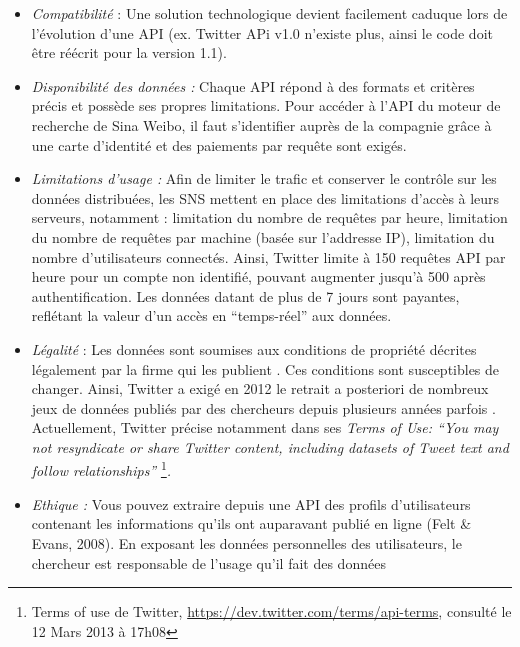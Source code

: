 \begin{itemize}
\item \textit{Compatibilit\'e }: Une solution technologique devient
facilement caduque lors de l{\textquoteright}\'evolution
d{\textquoteright}une API (ex. Twitter APi v1.0
n{\textquoteright}existe plus, ainsi le code doit \^etre r\'e\'ecrit
pour la version 1.1). 
\item \textit{Disponibilit\'e des donn\'ees :} Chaque API r\'epond \`a
des formats et crit\`eres pr\'ecis et poss\`ede ses propres
limitations. Pour acc\'eder \`a l{\textquoteright}API du moteur de
recherche de Sina Weibo, il faut s{\textquoteright}identifier aupr\`es
de la compagnie gr\^ace \`a une carte d{\textquoteright}identit\'e et
des paiements par requ\^ete sont exig\'es. 
\item \textit{Limitations d{\textquoteright}usage : }Afin de limiter le
trafic et conserver le contr\^ole sur les donn\'ees distribu\'ees, les
SNS mettent en place des limitations d{\textquoteright}acc\`es \`a
leurs serveurs, notamment : limitation du nombre de requ\^etes par
heure, limitation du nombre de requ\^etes par machine (bas\'ee sur
l{\textquoteright}addresse IP), limitation du nombre
d{\textquoteright}utilisateurs connect\'es. Ainsi, Twitter limite \`a
150 requ\^etes API par heure pour un compte non identifi\'e, pouvant
augmenter jusqu{\textquoteright}\`a 500 apr\`es authentification. Les
donn\'ees datant de plus de 7 jours sont payantes, refl\'etant la
valeur d{\textquoteright}un acc\`es en
{\textquotedblleft}temps-r\'eel{\textquotedblright} aux donn\'ees.
\item \textit{L\'egalit\'e }: Les donn\'ees sont soumises aux conditions
de propri\'et\'e d\'ecrites l\'egalement par la firme qui les publient
\citep{Clifton2006}. Ces conditions sont susceptibles de changer. Ainsi,
Twitter a exig\'e en 2012 le retrait a posteriori de nombreux jeux de
donn\'ees publi\'es par des chercheurs depuis plusieurs ann\'ees
parfois \citep{McCreadie2012}. Actuellement, Twitter pr\'ecise notamment
dans ses \textit{Terms of Use: {\textquotedblleft}You may not
resyndicate or share Twitter content, including datasets of Tweet text
and follow relationships{\textquotedblright} }\footnote{ Terms of use
de Twitter, \url{https://dev.twitter.com/terms/api-terms}, consult\'e
le 12 Mars 2013 \`a 17h08}\textit{. ~}
\item \textit{Ethique : }Vous pouvez extraire depuis une API des profils
d{\textquoteright}utilisateurs contenant les informations
qu{\textquoteright}ils ont auparavant publi\'e en ligne (Felt \& Evans,
2008). En exposant les donn\'ees personnelles des utilisateurs, le
chercheur est responsable de l{\textquoteright}usage
qu{\textquoteright}il fait des donn\'ees \citep{Rieder2005} 
\end{itemize}
